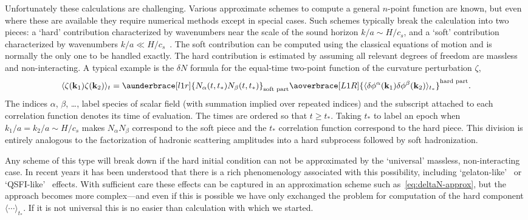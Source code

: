 \documentclass[11pt,a4paper]{article}
\newcommand{\vect}[1]{\bm{\mathrm{{#1}}}}
\renewcommand{\geq}{\geqslant}
\begin{document}
Unfortunately these calculations are challenging.
Various
approximate schemes to compute a general $n$-point function are known,
but even where these are available they require numerical methods
except in special cases.
Such schemes typically break the calculation into two pieces:
a `hard' contribution characterized by wavenumbers near the scale
of the sound horizon $k/a \sim H / c_s$,
and a `soft' contribution characterized by wavenumbers
$k/a \ll H / c_s$~\cite{Dias:2012qy}.
The soft contribution can be computed using the classical
equations of motion and is normally the only one to be handled exactly.
The hard contribution is estimated by assuming
all relevant degrees of freedom are massless and non-interacting.
A typical example is the $\delta N$ formula for the
equal-time two-point function
of the curvature perturbation $\zeta$,
\begin{equation}
    \langle \zeta(\vect{k}_1) \zeta(\vect{k}_2) \rangle_t
    = \aunderbrace[l1r]{N_\alpha(t, t_\ast) N_\beta(t, t_\ast)}_{\text{soft part}}
    \aoverbrace[L1R]{\langle \delta\phi^\alpha(\vect{k}_1) \delta\phi^\beta(\vect{k}_2) \rangle_{t_\ast}}^{\text{hard part}} .
    \label{eq:deltaN-approx}
\end{equation}
The indices $\alpha$, $\beta$, \ldots, label species of scalar
field (with summation implied over repeated indices)
and the subscript attached to each correlation function
denotes its time of evaluation.
The times are ordered so that $t \geq t_\ast$.
Taking $t_\ast$ to label an epoch when
$k_1 / a = k_2 / a \sim H / c_s$
makes $N_\alpha N_\beta$
correspond to the soft piece
and the $t_\ast$ correlation function
correspond to the hard piece.
This division is entirely analogous to the factorization
of hadronic scattering amplitudes into a hard subprocess
followed by soft hadronization.

Any scheme of this type will break down if the
hard initial condition
can not be approximated by the `universal'
massless, non-interacting case.
In recent years it has been understood that there is
a rich phenomenology associated with this possibility,
including `gelaton-like'~\cite{Tolley:2009fg}
or
`QSFI-like'~\cite{Chen:2009we,Chen:2009zp,Chen:2012ge}
effects.
With sufficient care these effects can be captured
in an approximation scheme such as~\eqref{eq:deltaN-approx},
but the approach becomes more complex---and
even if this is possible we have only exchanged the problem
for computation of the hard
component
$\langle \cdots \rangle_{t_\ast}$.
If it is not universal
this is
no easier than
calculation with which we started.
\end{document}
